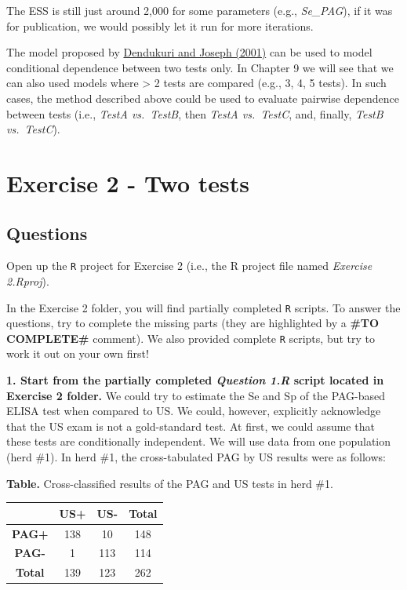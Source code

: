 \documentclass[
]{book}
\begin{document}
The ESS is still just around 2,000 for some parameters (e.g., \emph{Se\_PAG}), if it was for publication, we would possibly let it run for more iterations.

The model proposed by \href{https://onlinelibrary.wiley.com/doi/10.1111/j.0006-341X.2001.00158.x}{Dendukuri and Joseph (2001)} can be used to model conditional dependence between two tests only. In Chapter 9 we will see that we can also used models where \textgreater{} 2 tests are compared (e.g., 3, 4, 5 tests). In such cases, the method described above could be used to evaluate pairwise dependence between tests (i.e., \emph{TestA vs.~TestB}, then \emph{TestA vs.~TestC}, and, finally, \emph{TestB vs.~TestC}).

\chapter{Exercise 2 - Two tests}\label{exercise-2---two-tests}

\section{Questions}\label{questions-1}

Open up the \texttt{R} project for Exercise 2 (i.e., the R project file named \emph{Exercise 2.Rproj}).

In the Exercise 2 folder, you will find partially completed \texttt{R} scripts. To answer the questions, try to complete the missing parts (they are highlighted by a \textbf{\#TO COMPLETE\#} comment). We also provided complete \texttt{R} scripts, but try to work it out on your own first!

\textbf{1. Start from the partially completed \emph{Question 1.R} script located in Exercise 2 folder.} We could try to estimate the Se and Sp of the PAG-based ELISA test when compared to US. We could, however, explicitly acknowledge that the US exam is not a gold-standard test. At first, we could assume that these tests are conditionally independent. We will use data from one population (herd \#1). In herd \#1, the cross-tabulated PAG by US results were as follows:

\textbf{Table.} Cross-classified results of the PAG and US tests in herd \#1.

\begin{longtable}[]{@{}cccc@{}}
\toprule\noalign{}
& \textbf{US+} & \textbf{US-} & \textbf{Total} \\
\midrule\noalign{}
\endhead
\bottomrule\noalign{}
\endlastfoot
\textbf{PAG+} & 138 & 10 & 148 \\
\textbf{PAG-} & 1 & 113 & 114 \\
\textbf{Total} & 139 & 123 & 262 \\
\end{longtable}
\end{document}
